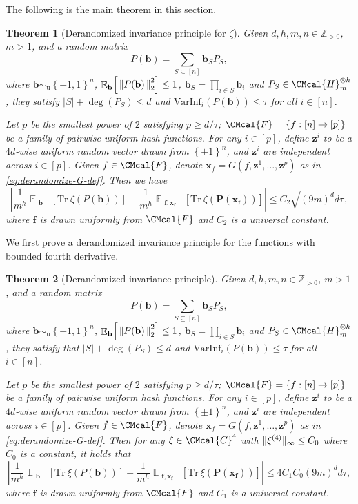 \documentclass[10pt,a4paper]{article}
\def\C{\CMcal{C}}
\def\F{\CMcal{F}}
\def\H{\CMcal{H}}
\theoremstyle{plain}
\newtheorem{theorem}{Theorem}[section]
\theoremstyle{definition}
\newcommand {\minusspace} {\: \! \!}
\newcommand {\Fn} [2] {\ensuremath{ #1 \minusspace \Br{ #2 } }}
\newcommand {\set} [1] {\ensuremath{ \left\lbrace #1 \right\rbrace }}
\newcommand {\br} [1] {\ensuremath{ \left( #1 \right) }}
\newcommand {\Br} [1] {\ensuremath{ \left[ #1 \right] }}
\DeclarePairedDelimiter{\norm}{\lVert}{\rVert}
\newcommand {\ab} [1] {\ensuremath{ \left| #1 \right| }}
\DeclareMathOperator*{\bigE}{\mathbb{E}}
\newcommand {\expec} [2] {\Fn{\bigE_{\substack{#1}}}{#2}}
\newcommand{\nnorm}[1]{{\left\vert\kern-0.25ex\left\vert\kern-0.25ex\left\vert #1
		\right\vert\kern-0.25ex\right\vert\kern-0.25ex\right\vert}}
\newcommand {\Tr} {\ensuremath{ \mathrm{Tr} }}
\newcommand{\posint}{{\mathbb Z}_{>0}}
\newcommand{\randP}{\ensuremath{\mathbf{P}}}
\newcommand{\randb}{\ensuremath{\mathbf{b}}}
\newcommand{\randz}{\ensuremath{\mathbf{z}}}
\newcommand{\randx}{\ensuremath{\mathbf{x}}}
\newcommand{\randf}{\ensuremath{\mathbf{f}}}
\newcommand{\herspace}[1]{\ensuremath{\H_m^{\otimes #1}}}
\newcommand{\varinfi}[1]{\ensuremath{\mathrm{VarInf}_i}\br{#1}}
\newcommand{\bits}[1]{\ensuremath{\set{-1,1}^{#1}}}
\newcommand{\usim}{\ensuremath{\sim_{\mathrm{u}}}}
\newcommand{\1}{\mathbb{1}} %
\begin{document}
The following is the main theorem in this section.
\begin{theorem}[Derandomized invariance principle for $\zeta$]\label{thm:derandomize}
Given $d,h,m,n\in\posint$, $m>1$, and a random matrix
\[P(\randb)=\sum_{S\subseteq[n]}\randb_SP_S,\]
where $\randb\usim\bits{n}$, $\expec{\randb}{\nnorm{P(\randb)}_2^2}\leq1$, $\randb_S=\prod_{i\in S}\randb_i$ and $P_S\in\herspace{h}$, they satisfy  $\ab{S}+\deg\br{P_S}\leq d$ and $\varinfi{P(\randb)}\leq\tau$ for all $i\in[n]$. 

Let $p$ be the smallest power of $2$ satisfying $p\ge d/\tau$; $\F=\set{f:[n]\to[p]}$ be a family of pairwise uniform hash functions. For any $i \in [p]$, define $\randz^i$ to be a $4d$-wise uniform random vector drawn from $\set{\pm 1}^n$, and $\randz^i$ are independent across $i\in[p]$. Given $f\in\F$, denote $\randx_f=G\br{f,\randz^1,\dots,\randz^p}$ as in \cref{eq:derandomize-G-def}. Then we have
\[\ab{\frac{1}{m^h}\expec{\randb}{\Tr~\zeta\br{P(\randb)}}-\frac{1}{m^h}\expec{\randf,\randx_\randf}{\Tr~\zeta\br{\randP(\randx_\randf)}}}\leq C_2\sqrt{(9m)^dd\tau},\]
where $\randf$ is drawn uniformly from $\F$ and $C_2$ is a universal constant.
\end{theorem}

We first prove a derandomized invariance principle for the functions with bounded fourth derivative.
\begin{theorem}[Derandomized invariance principle]\label{thm:smoothderandomize}
Given $d,h,m,n\in\posint$, $m>1$, and a random matrix
\[P(\randb)=\sum_{S\subseteq[n]}\randb_SP_S,\]
where $\randb\usim\bits{n}$, $\expec{\randb}{\nnorm{P(\randb)}_2^2}\leq1$, $\randb_S=\prod_{i\in S}\randb_i$ and $P_S\in\herspace{h}$, they satisfy that  $\ab{S}+\deg\br{P_S}\leq d$ and $\varinfi{P(\randb)}\leq\tau$ for all $i\in[n]$. 

Let $p$ be the smallest power of $2$ satisfying $p\ge d/\tau$; $\F=\set{f:[n]\to[p]}$ be a family of pairwise uniform hash functions. For any $i\in[p]$, define $\randz^i$ to be a $4d$-wise uniform random vector drawn from $\set{\pm 1}^n$, and $\randz^i$ are independent across $i\in[p]$. Given $f\in\F$, denote $\randx_f=G\br{f,\randz^1,\dots,\randz^p}$ as in \cref{eq:derandomize-G-def}. Then for any $\xi\in\C^4$ with $\norm{\xi^{(4)}}_\infty\leq C_0$ where $C_0$ is a constant, it holds that 
\[\ab{\frac{1}{m^h}\expec{\randb}{\Tr~\xi\br{P(\randb)}}-\frac{1}{m^h}\expec{\randf,\randx_\randf}{\Tr~\xi\br{\randP(\randx_\randf)}}}\leq 4C_1C_0(9m)^dd\tau,\]
where $\randf$ is drawn uniformly from $\F$ and $C_1$ is a universal constant.
\end{theorem}
\end{document}
